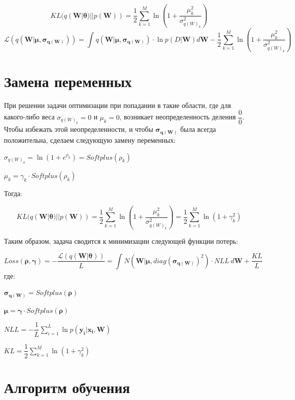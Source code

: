 \documentclass{article}
\begin{document}
\[
KL(q(\mathbf{W} | \pmb{\theta}) || p(\mathbf{W})) =
\dfrac{1}{2}\sum_{k=1}^{M}\ln({1 + \dfrac{\mu_{k}^2}{\sigma_{{q(W)_{k}}}^2}})
\]
\[
\mathcal{L}(q(\mathbf{W} | \pmb{\mu}, \pmb{\sigma_{q(\mathbf{W})}})) =
\int_{}{} q(\mathbf{W} | \pmb{\mu}, \pmb{\sigma_{q(\mathbf{W})}}) \cdot \ln{p(D | \mathbf{W})} d\mathbf{W} - \dfrac{1}{2}\sum_{k=1}^{M}\ln({1 + \dfrac{\mu_{k}^2}{\sigma_{{q(W)_{k}}}^2}})
\]

\section{Замена переменных}

При решении задачи оптимизации при попадании в такие области, где для какого-либо веса $\sigma_{{q(W)_{k}}} = 0$ и $\mu_{k} = 0$, возникает неопределенность деления $\dfrac{0}{0}$. Чтобы избежать этой неопределенности, и чтобы $\pmb{\sigma_{q(\mathbf{W})}}$ была всегда положительна, сделаем следующую замену переменных:

$\sigma_{{q(W)_{k}}} = \ln({1 + e^{\rho_{k}}}) = Softplus(\rho_{k})$

$\mu_{k} = \gamma_{k} \cdot Softplus(\rho_{k})$

Тогда:

\[
KL(q(\mathbf{W} | \pmb{\theta}) || p(\mathbf{W})) =
\dfrac{1}{2}\sum_{k=1}^{M}\ln({1 + \dfrac{\mu_{k}^2}{\sigma_{{q(W)_{k}}}^2}}) =
\dfrac{1}{2}\sum_{k=1}^{M}\ln({1 + \gamma_{k}^{2}})
\]

Таким образом, задача сводится к минимизации следующей функции потерь:

\[
Loss(\pmb{\rho}, \pmb{\gamma}) =
- \dfrac{\mathcal{L}(q(\mathbf{W} | \pmb{\theta}))}{L} =
\int_{}{} N(\mathbf{W} | \pmb{\mu}, diag(\pmb{\sigma_{q(\mathbf{W})}})^{2}) \cdot NLL ~ d\mathbf{W} + \dfrac{KL}{L}
\] где:

$\pmb{\sigma_{q(\mathbf{W})}} = Softplus(\pmb{\rho})$

$\pmb{\mu} = \pmb{\gamma} \cdot Softplus(\pmb{\rho})$

$NLL = -\dfrac{1}{L}\sum_{i=1}^{L}{\ln{p( \mathbf{y_{i}} | \mathbf{x_{i}}, \mathbf{W})}}$

$KL = \dfrac{1}{2}\sum_{k=1}^{M}\ln({1 + \gamma_{k}^{2}})$

\section{Алгоритм обучения}
\end{document}
